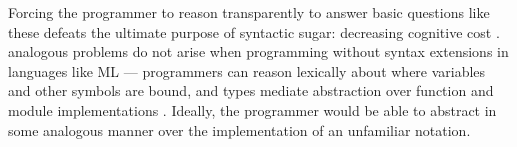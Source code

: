 \documentclass[acmsmall,screen]{acmart}
\begin{document}
Forcing the programmer to reason transparently to answer basic questions like these defeats the ultimate purpose of syntactic sugar: decreasing cognitive cost \cite{Green89}. analogous problems do not arise when programming without syntax extensions in languages like ML --- programmers can reason lexically about where variables and other symbols are bound, and types mediate abstraction over function and module implementations \cite{B304}. Ideally, the programmer would be able to abstract in some analogous manner over the implementation of an unfamiliar notation. %
\end{document}
